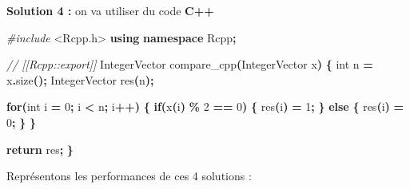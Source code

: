 \documentclass[
]{book}
\newenvironment{Shaded}{\begin{snugshade}}{\end{snugshade}}
\newcommand{\AttributeTok}[1]{\textcolor[rgb]{0.77,0.63,0.00}{#1}}
\newcommand{\CommentTok}[1]{\textcolor[rgb]{0.56,0.35,0.01}{\textit{#1}}}
\newcommand{\ControlFlowTok}[1]{\textcolor[rgb]{0.13,0.29,0.53}{\textbf{#1}}}
\newcommand{\DataTypeTok}[1]{\textcolor[rgb]{0.13,0.29,0.53}{#1}}
\newcommand{\DecValTok}[1]{\textcolor[rgb]{0.00,0.00,0.81}{#1}}
\newcommand{\FunctionTok}[1]{\textcolor[rgb]{0.00,0.00,0.00}{#1}}
\newcommand{\ImportTok}[1]{#1}
\newcommand{\KeywordTok}[1]{\textcolor[rgb]{0.13,0.29,0.53}{\textbf{#1}}}
\newcommand{\NormalTok}[1]{#1}
\newcommand{\OperatorTok}[1]{\textcolor[rgb]{0.81,0.36,0.00}{\textbf{#1}}}
\newcommand{\OtherTok}[1]{\textcolor[rgb]{0.56,0.35,0.01}{#1}}
\newcommand{\PreprocessorTok}[1]{\textcolor[rgb]{0.56,0.35,0.01}{\textit{#1}}}
\newcommand{\SpecialCharTok}[1]{\textcolor[rgb]{0.00,0.00,0.00}{#1}}
\newcommand{\StringTok}[1]{\textcolor[rgb]{0.31,0.60,0.02}{#1}}
\theoremstyle{definition}
\theoremstyle{definition}
\theoremstyle{definition}
\theoremstyle{definition}
\theoremstyle{remark}
\begin{document}
\textbf{Solution 4 :} on va utiliser du code \textbf{C++}

\begin{Shaded}
\begin{Highlighting}[]
\PreprocessorTok{\#include }\ImportTok{\textless{}Rcpp.h\textgreater{}}
\KeywordTok{using} \KeywordTok{namespace}\NormalTok{ Rcpp}\OperatorTok{;}
  
\CommentTok{// [[Rcpp::export]]}
\NormalTok{IntegerVector compare\_cpp}\OperatorTok{(}\NormalTok{IntegerVector x}\OperatorTok{)} \OperatorTok{\{}
    \DataTypeTok{int}\NormalTok{ n }\OperatorTok{=}\NormalTok{ x}\OperatorTok{.}\NormalTok{size}\OperatorTok{();}
\NormalTok{    IntegerVector res}\OperatorTok{(}\NormalTok{n}\OperatorTok{);}
    
    \ControlFlowTok{for}\OperatorTok{(}\DataTypeTok{int}\NormalTok{ i }\OperatorTok{=} \DecValTok{0}\OperatorTok{;}\NormalTok{ i }\OperatorTok{\textless{}}\NormalTok{ n}\OperatorTok{;}\NormalTok{ i}\OperatorTok{++)} \OperatorTok{\{}
      \ControlFlowTok{if}\OperatorTok{(}\NormalTok{x}\OperatorTok{(}\NormalTok{i}\OperatorTok{)} \OperatorTok{\%} \DecValTok{2} \OperatorTok{==} \DecValTok{0}\OperatorTok{)} \OperatorTok{\{}
\NormalTok{      res}\OperatorTok{(}\NormalTok{i}\OperatorTok{)} \OperatorTok{=} \DecValTok{1}\OperatorTok{;}
      \OperatorTok{\}} \ControlFlowTok{else} \OperatorTok{\{}
\NormalTok{      res}\OperatorTok{(}\NormalTok{i}\OperatorTok{)} \OperatorTok{=} \DecValTok{0}\OperatorTok{;}
      \OperatorTok{\}}
    \OperatorTok{\}}
    
    \ControlFlowTok{return}\NormalTok{ res}\OperatorTok{;}
\OperatorTok{\}}
\end{Highlighting}
\end{Shaded}

\begin{Shaded}
\end{Shaded}

Représentons les performances de ces 4 solutions :

\begin{Shaded}
\end{Shaded}
\end{document}
